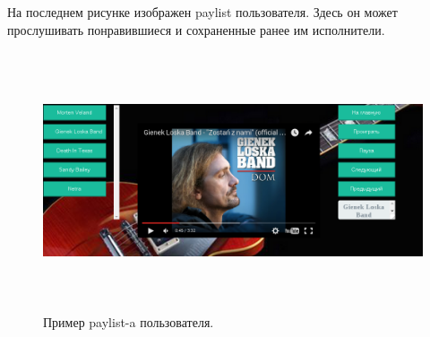 На последнем рисунке изображен paylist пользователя. Здесь он может прослушивать понравившиеся и сохраненные ранее им исполнители.
\begin{figure}[h]
\label{pic:lf-screen3}
\caption{Пример paylist-a пользователя.}
\begin{center}
  \includegraphics[width=5in,height=3in]{pics/lastfm-mylist.png}
\end{center}
\end{figure}
